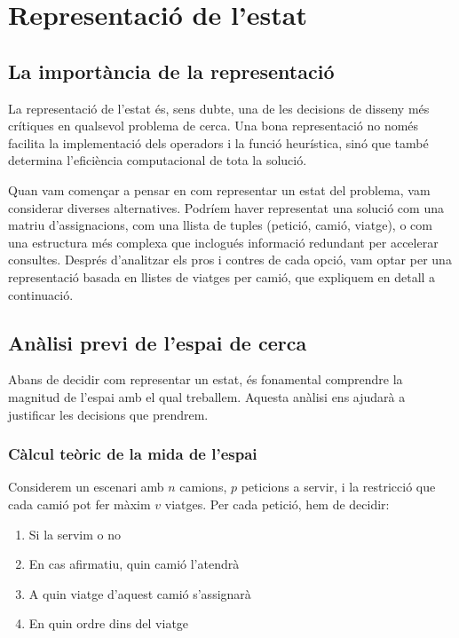 \section{Representació de l'estat}
\label{sec:state}

\subsection{La importància de la representació}

La representació de l'estat és, sens dubte, una de les decisions de disseny més crítiques en qualsevol problema de cerca. Una bona representació no només facilita la implementació dels operadors i la funció heurística, sinó que també determina l'eficiència computacional de tota la solució. 

Quan vam començar a pensar en com representar un estat del problema, vam considerar diverses alternatives. Podríem haver representat una solució com una matriu d'assignacions, com una llista de tuples (petició, camió, viatge), o com una estructura més complexa que inclogués informació redundant per accelerar consultes. Després d'analitzar els pros i contres de cada opció, vam optar per una representació basada en llistes de viatges per camió, que expliquem en detall a continuació.

\subsection{Anàlisi previ de l'espai de cerca}

Abans de decidir com representar un estat, és fonamental comprendre la magnitud de l'espai amb el qual treballem. Aquesta anàlisi ens ajudarà a justificar les decisions que prendrem.

\subsubsection{Càlcul teòric de la mida de l'espai}

Considerem un escenari amb $n$ camions, $p$ peticions a servir, i la restricció que cada camió pot fer màxim $v$ viatges. Per cada petició, hem de decidir:

\begin{enumerate}
    \item Si la servim o no
    \item En cas afirmatiu, quin camió l'atendrà
    \item A quin viatge d'aquest camió s'assignarà
    \item En quin ordre dins del viatge
\end{enumerate}

